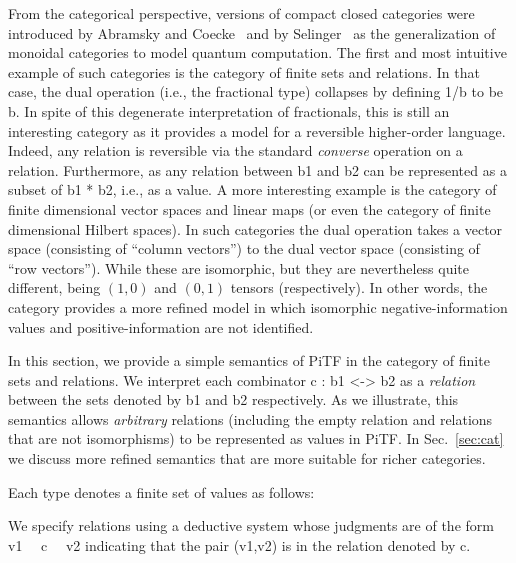 \documentclass{llncs}
\begin{document}
From the categorical perspective, versions of compact closed categories were
introduced by Abramsky and Coecke~\cite{Abramsky:2004:CSQ:1018438.1021878}
and by Selinger~\cite{Selinger:2007:DCC:1229185.1229207} as the
generalization of monoidal categories to model quantum computation.  The
first and most intuitive example of such categories is the category of finite
sets and relations. In that case, the dual operation (i.e., the fractional
type) collapses by defining {{1/b}} to be {{b}}. In spite of this degenerate
interpretation of fractionals, this is still an interesting category as it
provides a model for a reversible higher-order language. Indeed, any relation
is reversible via the standard \emph{converse} operation on a relation.
Furthermore, as any relation between {{b1}} and {{b2}} can be
represented as a subset of {{b1 * b2}}, i.e., as a value. A more interesting
example is the category of finite dimensional vector spaces and linear maps
(or even the category of finite dimensional Hilbert spaces). In such
categories the dual operation takes a vector space (consisting of ``column
vectors'') to the dual vector space (consisting of ``row vectors''). While
these are isomorphic, but they are nevertheless quite different,
being $(1,0)$ and $(0,1)$ tensors (respectively).  In other words, the
category provides a more refined model in which isomorphic
negative-information values and positive-information are not identified.

In this section, we provide a simple semantics of {{PiTF}} in the category of
finite sets and relations. We interpret each combinator 
{{c : b1 <-> b2}} as a \emph{relation} between the sets denoted by {{b1}} and
{{b2}} respectively. As we illustrate, this semantics allows \emph{arbitrary}
relations (including the empty relation and relations that are not
isomorphisms) to be represented as values in {{PiTF}}.  In Sec.~\ref{sec:cat}
we discuss more refined semantics that are more suitable for richer
categories.

\begin{definition}
\label{chx:def:denot}
Each type denotes a finite set of values as follows:
\end{definition}

We specify
relations using a deductive system whose judgments are of the form 
{{ v1 ~~c~~ v2 }} indicating that the pair {{(v1,v2)}} is in the relation 
denoted by {{c}}.
\end{document}
